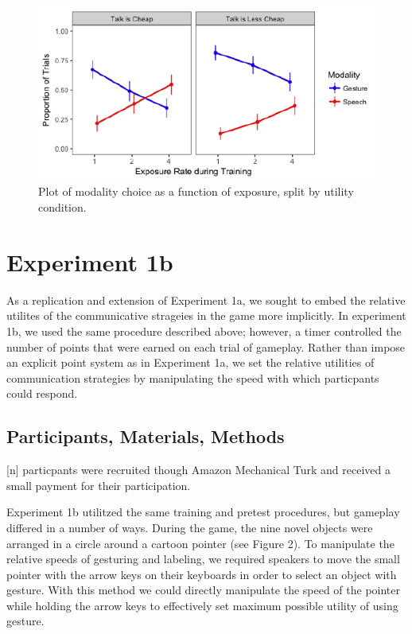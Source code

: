 \documentclass[10pt, letterpaper]{article}
\newenvironment{CodeChunk}{}{}
\begin{document}
\begin{CodeChunk}
\begin{figure}[H]

{\centering \includegraphics{figs/image1-1} 

}

\caption[Plot of modality choice as a function of exposure, split by utility condition]{Plot of modality choice as a function of exposure, split by utility condition.}\label{fig:image1}
\end{figure}
\end{CodeChunk}

\section{Experiment 1b}\label{experiment-1b}

As a replication and extension of Experiment 1a, we sought to embed the
relative utilites of the communicative strageies in the game more
implicitly. In experiment 1b, we used the same procedure described
above; however, a timer controlled the number of points that were earned
on each trial of gameplay. Rather than impose an explicit point system
as in Experiment 1a, we set the relative utilities of communication
strategies by manipulating the speed with which particpants could
respond.

\subsection{Participants, Materials,
Methods}\label{participants-materials-methods-1}

{[}n{]} particpants were recruited though Amazon Mechanical Turk and
received a small payment for their participation.

Experiment 1b utilitzed the same training and pretest procedures, but
gameplay differed in a number of ways. During the game, the nine novel
objects were arranged in a circle around a cartoon pointer (see Figure
2). To manipulate the relative speeds of gesturing and labeling, we
required speakers to move the small pointer with the arrow keys on their
keyboards in order to select an object with gesture. With this method we
could directly manipulate the speed of the pointer while holding the
arrow keys to effectively set maximum possible utility of using gesture.
\end{document}
